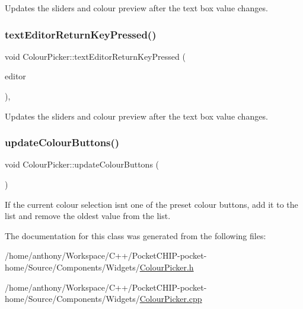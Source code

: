 Updates the sliders and colour preview after the text box value changes. \mbox{\label{classColourPicker_aa9e98e6dfda7410c7de9b1dbaf05ef19}} 
\subsubsection{\texorpdfstring{text\+Editor\+Return\+Key\+Pressed()}{textEditorReturnKeyPressed()}}
{\footnotesize\ttfamily void Colour\+Picker\+::text\+Editor\+Return\+Key\+Pressed (\begin{DoxyParamCaption}\item[{Text\+Editor \&}]{editor }\end{DoxyParamCaption})\hspace{0.3cm}{\ttfamily [override]}, {\ttfamily [protected]}}

Updates the sliders and colour preview after the text box value changes. \mbox{\label{classColourPicker_a74764d4f6457f505f3ccb412c8628f44}} 
\subsubsection{\texorpdfstring{update\+Colour\+Buttons()}{updateColourButtons()}}
{\footnotesize\ttfamily void Colour\+Picker\+::update\+Colour\+Buttons (\begin{DoxyParamCaption}{ }\end{DoxyParamCaption})\hspace{0.3cm}{\ttfamily [protected]}}

If the current colour selection isn\textquotesingle{}t one of the preset colour buttons, add it to the list and remove the oldest value from the list. 

The documentation for this class was generated from the following files\+:\begin{DoxyCompactItemize}
\item 
/home/anthony/\+Workspace/\+C++/\+Pocket\+C\+H\+I\+P-\/pocket-\/home/\+Source/\+Components/\+Widgets/\mbox{\hyperlink{ColourPicker_8h}{Colour\+Picker.\+h}}\item 
/home/anthony/\+Workspace/\+C++/\+Pocket\+C\+H\+I\+P-\/pocket-\/home/\+Source/\+Components/\+Widgets/\mbox{\hyperlink{ColourPicker_8cpp}{Colour\+Picker.\+cpp}}\end{DoxyCompactItemize}
